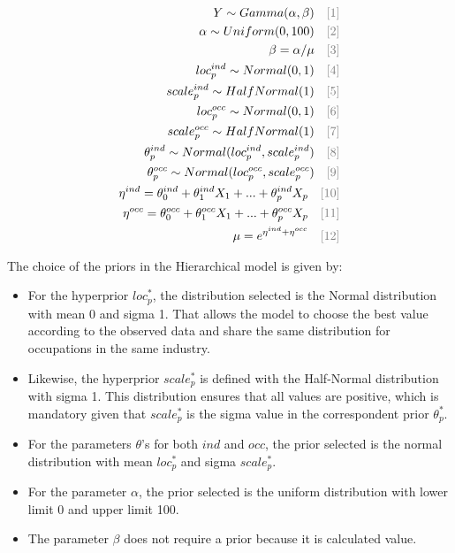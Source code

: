  \begin{gather}
    \begin{split}
        Y \sim Gamma(\alpha,\beta) \quad \textcolor{gray}{[\text{1}]} \\
        \alpha \sim Uniform(0, 100) \quad \textcolor{gray}{[\text{2}]} \\
        \beta=\alpha/\mu \quad \textcolor{gray}{[\text{3}]} \\
        loc_{p}^{ind} \sim Normal(0,1) \quad \textcolor{gray}{[\text{4}]} \\
        scale_{p}^{ind} \sim HalfNormal(1) \quad \textcolor{gray}{[\text{5}]} \\
        loc_{p}^{occ} \sim Normal(0,1) \quad \textcolor{gray}{[\text{6}]} \\
        scale_{p}^{occ} \sim HalfNormal(1) \quad \textcolor{gray}{[\text{7}]} \\
        \theta_{p}^{ind} \sim Normal(loc_{p}^{ind}, scale_{p}^{ind}) \quad \textcolor{gray}{[\text{8}]} \\
        \theta_{p}^{occ} \sim Normal(loc_{p}^{occ}, scale_{p}^{occ}) \quad \textcolor{gray}{[\text{9}]} \\
        \eta^{ind} = \theta_0^{ind}+\theta_1^{ind}X_1+...+\theta_p^{ind}X_p \quad \textcolor{gray}{[\text{10}]} \\
        \eta^{occ} = \theta_0^{occ}+\theta_1^{occ}X_1+...+\theta_p^{occ}X_p \quad \textcolor{gray}{[\text{11}]} \\
        \mu=e^{\eta^{ind}+\eta^{occ}} \quad \textcolor{gray}{[\text{12}]} \\
    \end{split}\label{eq:hierarchical_model}
 \end{gather}

 The choice of the priors in the Hierarchical model is given by: 
\begin{itemize}
    \item For the hyperprior $loc_p^*$, the distribution selected is the Normal distribution with mean 0 and sigma 1. That allows the model to choose the best value according to the observed data and share the same distribution for occupations in the same industry. 

    \item Likewise, the hyperprior $scale_p^*$ is defined with the Half-Normal distribution with sigma 1. This distribution ensures that all values are positive, which is mandatory given that $scale_p^*$ is the sigma value in the correspondent prior $\theta_p^*$. 

    \item For the parameters $\theta$'s for both $ind$ and $occ$, the prior selected is the normal distribution with mean $loc_p^*$ and sigma $scale_p^*$. 

    \item For the parameter $\alpha$, the prior selected is the uniform distribution with lower limit 0 and upper limit 100. 

    \item The parameter $\beta$ does not require a prior because it is calculated value. 
\end{itemize}

